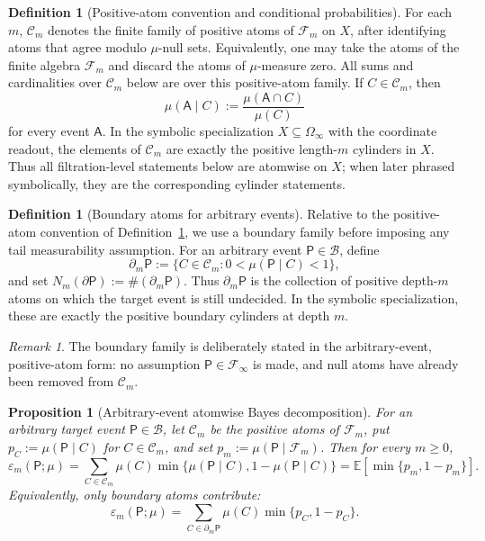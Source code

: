 \documentclass{etds}%
\numberwithin{equation}{section}
\theoremstyle{plain}
\newtheorem{proposition}[theorem]{Proposition}
\theoremstyle{definition}
\newtheorem{definition}[theorem]{Definition}
\theoremstyle{remark}
\newtheorem{remark}[theorem]{Remark}
\newcommand{\EE}{\mathbb{E}}
\begin{document}
\begin{definition}[Positive-atom convention and conditional probabilities]
\label{def:positive-atoms}
For each $m$, $\mathcal{C}_m$ denotes the finite family of positive atoms of
$\mathcal{F}_m$ on $X$, after identifying atoms that agree modulo
$\mu$-null sets.
Equivalently, one may take the atoms of the finite algebra $\mathcal{F}_m$ and
discard the atoms of $\mu$-measure zero.  All sums and cardinalities over
$\mathcal{C}_m$ below are over this positive-atom family.  If
$C\in\mathcal{C}_m$, then
\[
\mu(\mathsf{A}\mid C):=\frac{\mu(\mathsf{A}\cap C)}{\mu(C)}
\]
for every event $\mathsf{A}$.  In the symbolic specialization
$X\subseteq\Omega_\infty$ with the coordinate readout, the elements of
$\mathcal{C}_m$ are exactly the positive length-$m$ cylinders in $X$.  Thus
all filtration-level statements below are atomwise on $X$; when later phrased
symbolically, they are the corresponding cylinder statements.
\end{definition}

\begin{definition}[Boundary atoms for arbitrary events]
\label{def:boundary-atoms}
Relative to the positive-atom convention of Definition~\ref{def:positive-atoms},
we use a boundary family before imposing any tail measurability assumption.
For an arbitrary event $\mathsf{P}\in\mathcal{B}$, define
\[
\partial_m\mathsf{P}
:=\{C\in\mathcal{C}_m:0<\mu(\mathsf{P}\mid C)<1\},
\]
and set $N_m(\partial\mathsf{P}):=\#(\partial_m\mathsf{P})$.
Thus $\partial_m\mathsf{P}$ is the collection of positive depth-$m$ atoms on
which the target event is still undecided.  In the symbolic specialization,
these are exactly the positive boundary cylinders at depth $m$.
\end{definition}

\begin{remark}
The boundary family is deliberately stated in the arbitrary-event,
positive-atom form: no assumption $\mathsf{P}\in\mathcal{F}_\infty$ is made,
and null atoms have already been removed from $\mathcal{C}_m$.
\end{remark}

\begin{proposition}[Arbitrary-event atomwise Bayes decomposition]
\label{prop:scan-error-cylinder}
For an arbitrary target event $\mathsf{P}\in\mathcal{B}$, let
$\mathcal{C}_m$ be the positive atoms of $\mathcal{F}_m$, put
$p_C:=\mu(\mathsf{P}\mid C)$ for $C\in\mathcal{C}_m$, and set
$p_m:=\mu(\mathsf{P}\mid\mathcal{F}_m)$.  Then for every $m\ge 0$,
\[
\varepsilon_m(\mathsf{P};\mu)
=\sum_{C\in\mathcal{C}_m}\mu(C)\min\{\mu(\mathsf{P}\mid C),1-\mu(\mathsf{P}\mid C)\}
=\EE[\min\{p_m,1-p_m\}].
\]
Equivalently, only boundary atoms contribute:
\[
\varepsilon_m(\mathsf{P};\mu)
=\sum_{C\in\partial_m\mathsf{P}}\mu(C)\min\{p_C,1-p_C\}.
\]
\end{proposition}
\end{document}
